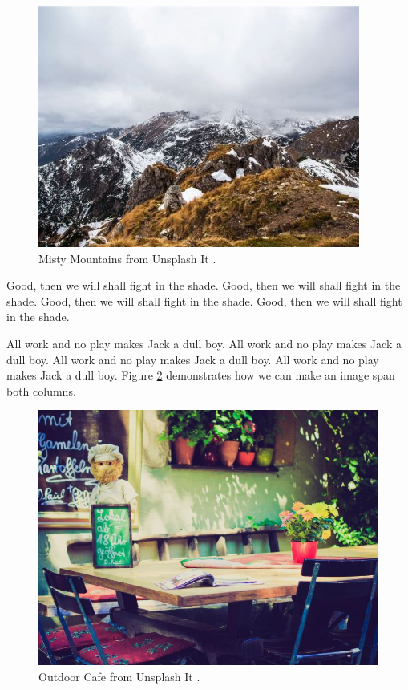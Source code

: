 \begin{figure}[ht]
\centering
\includegraphics[width=\linewidth,natwidth=400,natheight=300]{../figures/mountains.jpg}
\caption{Misty Mountains from Unsplash It \cite{unsplash}.}
\label{fig:mountains}
\end{figure}

Good, then we will shall fight in the shade.
Good, then we will shall fight in the shade.
Good, then we will shall fight in the shade.
Good, then we will shall fight in the shade.

All work and no play makes Jack a dull boy.
All work and no play makes Jack a dull boy.
All work and no play makes Jack a dull boy.
All work and no play makes Jack a dull boy.
Figure \ref{fig:outdoor_cafe} demonstrates how we can make an image span both columns.

\begin{figure}[ht]
\centering
\includegraphics[width=\textwidth,natwidth=800,natheight=600]{../figures/outdoor_cafe.jpg}
\caption{Outdoor Cafe from Unsplash It \cite{unsplash}.}
\label{fig:outdoor_cafe}
\end{figure}
